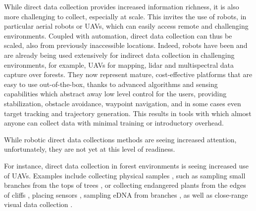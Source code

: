 




While direct data collection provides increased information richness, it is also more challenging to collect, especially at scale. 
This invites the use of robots, in particular aerial robots or UAVs, which can easily access remote and challenging environments. Coupled with automation, direct data collection can thus be scaled, also from previously inaccessible locations.
Indeed, robots have been and are already being used extensively for indirect data collection in challenging environments, for example, UAVs for mapping, lidar and multispectral data capture over forests. They now represent mature, cost-effective platforms that are easy to use out-of-the-box, thanks to advanced algorithms and sensing capabilities which abstract away low level control for the users, providing stabilization, obstacle avoidance, waypoint navigation, and in some cases even target tracking and trajectory generation. This results in tools with which almost anyone can collect data with minimal training or introductory overhead. 

While robotic direct data collections methods are seeing increased attention, unfortunately, they are not yet at this level of readiness.

For instance, direct data collection in forest environments is seeing increased use of UAVs.
Examples include collecting physical samples \cite{Krasylenko2023}, such as sampling small branches from the tops of trees \cite{Charron2020}, or collecting endangered plants from the edges of cliffs \cite{LaVigne2022}, placing sensors \cite{Hamaza2020, Farinha2020}, sampling eDNA from branches \cite{Aucone2023a}, as well as close-range visual data collection \cite{Liu2022, Zhou2022}.

